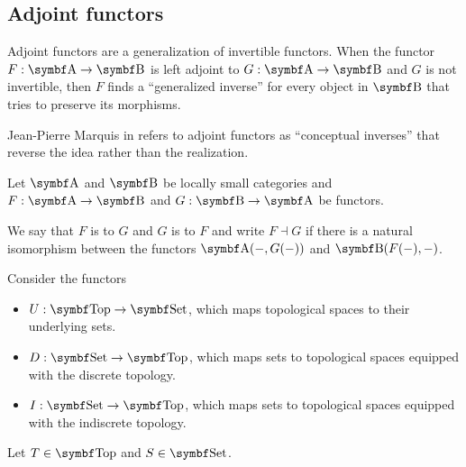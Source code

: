 \subsection{Adjoint functors}\label{subsec:adjoint_functors}

\begin{remark}\label{def:adjoint_functors}
  Adjoint functors are a generalization of invertible functors. When the functor \( F: \Bold A \to \Bold B \) is left adjoint to \( G: \Bold A \to \Bold B \) and \( G \) is not invertible, then \( F \) finds a \enquote{generalized inverse} for every object in \( \Bold B \) that tries to preserve its morphisms.

  Jean-Pierre Marquis in \cite{StanfordPlato:category_theory} refers to adjoint functors as \enquote{conceptual inverses} that reverse the idea rather than the realization.
\end{remark}

\begin{definition}\label{def:adjoint_functor}\cite[exercise 4.1.32]{Leinster2014}
  Let \( \Bold A \) and \( \Bold B \) be locally small categories and \( F: \Bold A \to \Bold B \) and \( G: \Bold B \to \Bold A \) be functors.

  We say that \( F \) is  to \( G \) and \( G \) is  to \( F \) and write \( F \dashv G \) if there is a natural isomorphism between the functors \( \Cat{A}(-, G(-)) \) and \( \Cat{B}(F(-), -) \).
\end{definition}

\begin{example}\label{ex:top_adjoint_functor}\cite[example 2.1.5]{Leinster2014}
  Consider the functors
  \begin{itemize}
    \item \( U: \Cat{Top} \to \Bold{Set} \), which maps topological spaces to their underlying sets.
    \item \( D: \Cat{Set} \to \Bold{Top} \), which maps sets to topological spaces equipped with the discrete topology.
    \item \( I: \Cat{Set} \to \Bold{Top} \), which maps sets to topological spaces equipped with the indiscrete topology.
  \end{itemize}

  Let \( T \in \Cat{Top} \) and \( S \in \Bold{Set} \).
\end{example}
